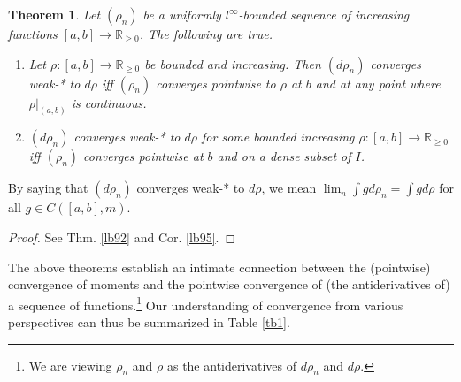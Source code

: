 \documentclass[12pt,b5paper,notitlepage]{article}
\theoremstyle{definition}
\theoremstyle{plain}
\newtheorem{thm}[df]{Theorem}
\newcommand{\Rbb}{\mathbb R}
\newcommand{\eps}{\varepsilon}
\numberwithin{equation}{section}
\begin{document}
\begin{comment}

Conversely, assume that $F(x)$ exists for all $x$. Let $M=\sup_n\Vert f_n\Vert_p$, which by assumption is finite. For each $\eps>0$ and for each mutually disjoint intervals $I_1=(a_1,b_1),\dots,I_k=(a_k,b_k)$ in $[a,b]$ with total length $\leq M^{-q}\eps^q$, setting $I=I_1\cup\cdots\cup I_k$, we have
\begin{align*}
\sum_{i=1}^k |F(b_i)-F(a_i)|\leq\sum_{i=1}^k \limsup_n\int_{I_i} |f_n|dm\leq M\Vert\chi_I\Vert_q=M\cdot m(I)^{\frac 1q}\leq \eps
\end{align*}
Therefore $F$ is absolutely continuous. Thus, $f:=F'$ exists a.e. and is $L^1$, and \eqref{eq12} holds for all $f$.
\end{comment}



\begin{thm}\label{lb21}
Let $(\rho_n)$ be a uniformly $l^\infty$-bounded sequence of increasing functions $[a,b]\rightarrow\Rbb_{\geq0}$.  The following are true.
\begin{enumerate}
\item Let $\rho:[a,b]\rightarrow\Rbb_{\geq0}$ be bounded and increasing. Then $(d\rho_n)$ converges weak-* to $d\rho$ iff $(\rho_n)$ converges pointwise to $\rho$ at $b$ and at any point where $\rho|_{(a,b)}$ is continuous.
\item $(d\rho_n)$ converges weak-* to $d\rho$ for some bounded increasing $\rho:[a,b]\rightarrow\Rbb_{\geq0}$ iff $(\rho_n)$ converges pointwise at $b$ and on a dense subset of $I$.
\end{enumerate}
\end{thm}

By saying that $(d\rho_n)$ converges weak-* to $d\rho$, we mean $\lim_n \int gd\rho_n=\int gd\rho$ for all $g\in C([a,b],m)$.

\begin{proof}
See Thm. \ref{lb92} and Cor. \ref{lb95}.
\end{proof}

The above theorems establish an intimate connection between the (pointwise) convergence of moments and the pointwise convergence of (the antiderivatives of) a sequence of functions.\footnote{We are viewing $\rho_n$ and $\rho$ as the antiderivatives of $d\rho_n$ and $d\rho$.} Our understanding of convergence from various perspectives can thus be summarized in Table \ref{tb1}.
\end{document}
